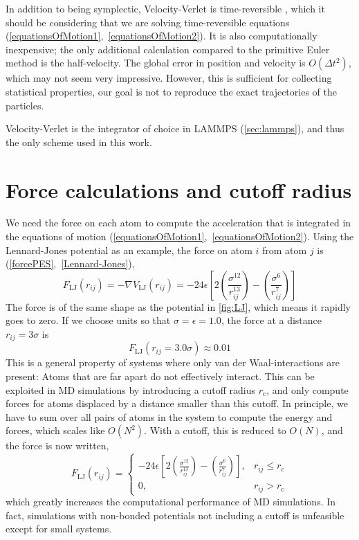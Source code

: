 \documentclass[twoside,english]{uiofysmaster}
\begin{document}
In addition to being symplectic, Velocity-Verlet is time-reversible \cite{Frenkel01}, which it should be considering that we 
are solving time-reversible equations (\ref{equationsOfMotion1},~\ref{equationsOfMotion2}).  
It is also computationally inexpensive; the only 
additional calculation compared to the primitive Euler method is the half-velocity. 
The global error in position and velocity is $O(\Delta t^2)$, which may not seem very impressive. However, 
this is sufficient for collecting statistical properties, 
our goal is not to reproduce the exact trajectories of the particles. 

Velocity-Verlet is the integrator of choice in LAMMPS (\autoref{sec:lammps}), and thus the 
only scheme used in this work. 

\section{Force calculations and cutoff radius} \label{sec:forceCutoff}
We need the force on each atom to compute the acceleration that is integrated in the equations of motion
(\ref{equationsOfMotion1},~\ref{equationsOfMotion2}). 
Using the Lennard-Jones potential as an example, 
the force on atom $i$ from atom $j$ is (\ref{forcePES},~\ref{Lennard-Jones}),
\begin{equation}
 F_{\mathrm{LJ}}(r_{ij}) = -\nabla V_{\mathrm{LJ}}(r_{ij}) = 
 -24\epsilon\left[2\left(\frac{\sigma^{12}}{r_{ij}^{13}}\right) - \left(\frac{\sigma^6}{r_{ij}^7}\right)\right] 
\end{equation}
The force is of the same shape 
as the potential in \autoref{fig:LJ}, which means it rapidly goes to zero. If we choose units so that
$\sigma=\epsilon=1.0$, the force at a distance $r_{ij} = 3\sigma$ is
\begin{equation}
 F_{\mathrm{LJ}}(r_{ij} = 3.0\sigma) \approx 0.01
\end{equation}
This is a general property of systems where only van der Waal-interactions are present: Atoms that 
are far apart do not effectively interact. This can be exploited in MD simulations by introducing 
a cutoff radius $r_\mathrm{c}$, and only compute forces for atoms displaced by a distance smaller than this cutoff. 
In principle, we have to sum over all pairs of atoms in the system to compute the energy and forces, which 
scales like $O(N^2)$. With a cutoff, this is reduced to $O(N)$, and the force is now written,
\begin{equation}
 F_{\mathrm{LJ}}(r_{ij}) = 
 \begin{cases}
  -24\epsilon\left[2\left(\frac{\sigma^{12}}{r_{ij}^{13}}\right) - \left(\frac{\sigma^6}{r_{ij}^7}\right)\right] ,
  & r_{ij} \leq r_\mathrm{c} \\
  0, & r_{ij} > r_\mathrm{c} 
 \end{cases}
 \label{forceCutoff}
\end{equation}
which greatly increases the computational performance of MD simulations. In fact, simulations with non-bonded potentials
not including a cutoff is unfeasible except for small systems.
\end{document}
